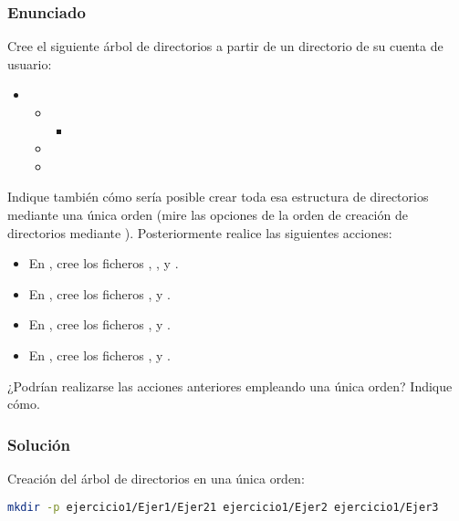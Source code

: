 \subsubsection{Enunciado}

Cree el siguiente árbol de directorios a partir de un directorio de su cuenta de usuario:

\begin{itemize}
	\item{}
	\begin{itemize}
		\item{}
		\begin{itemize}
			\item{}
		\end{itemize}
		\item{}
		\item{}
	\end{itemize}
\end{itemize}

Indique también cómo sería posible crear toda esa estructura de directorios mediante una única orden (mire las opciones de la orden de creación de directorios mediante ).
Posteriormente realice las siguientes acciones:

\begin{itemize}
	\item En , cree los ficheros , ,  y .
	\item En , cree los ficheros ,  y .
	\item En , cree los ficheros ,  y .
	\item En , cree los ficheros ,  y .
\end{itemize}

¿Podrían realizarse las acciones anteriores empleando una única orden?
Indique cómo.

\subsubsection{Solución}

Creación del árbol de directorios en una única orden:

\begin{lstlisting}[language=sh]
mkdir -p ejercicio1/Ejer1/Ejer21 ejercicio1/Ejer2 ejercicio1/Ejer3
\end{lstlisting}

